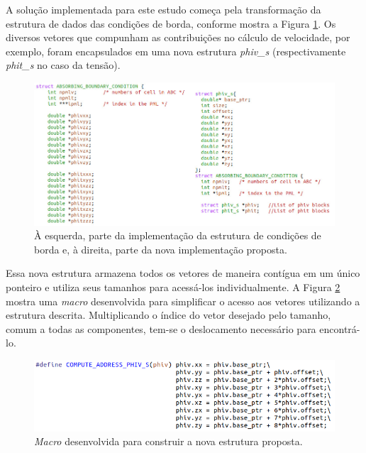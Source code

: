 \documentclass[cic,tc]{iiufrgs}
\begin{document}
A solução implementada para este estudo começa pela transformação da estrutura de dados das condições de borda, conforme mostra
a Figura \ref{fig:abc}. Os diversos vetores que compunham as contribuições no cálculo de velocidade, por exemplo, foram encapsulados
em uma nova estrutura \textit{phiv\_s} (respectivamente \textit{phit\_s} no caso da tensão). 
\begin{figure}[!htb]
  \caption{À esquerda, parte da implementação da estrutura de condições de borda e, à direita, parte da
  nova implementação proposta.}
    \begin{center} 
      \includegraphics[width=35em]{abc}
    \end{center}
    \label{fig:abc}
\end{figure}

Essa nova estrutura armazena todos os vetores de maneira contígua em um único ponteiro e utiliza seus tamanhos para acessá-los
individualmente. A Figura \ref{fig:compute_address} mostra uma \textit{macro} desenvolvida para simplificar o acesso aos vetores utilizando a estrutura
descrita. Multiplicando o índice do vetor desejado pelo tamanho, comum a todas as componentes, tem-se o deslocamento necessário para encontrá-lo.

\begin{figure}[!htb]
  \caption{\textit{Macro} desenvolvida para construir a nova estrutura proposta.}
    \begin{center} 
      \includegraphics[width=35em]{compute_address}
    \end{center}
    \label{fig:compute_address}
\end{figure}
\end{document}
